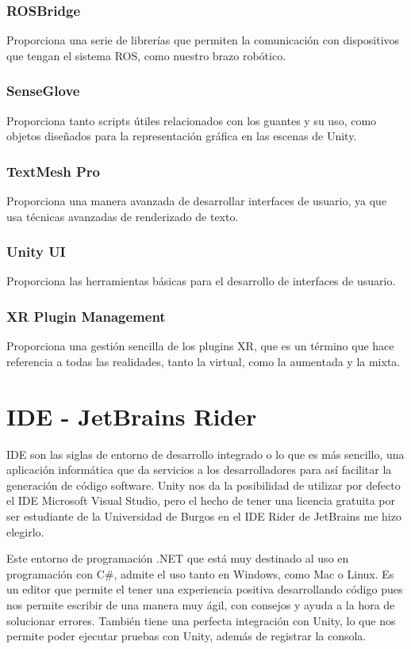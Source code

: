 \subsubsection{ROSBridge}
Proporciona una serie de librerías que permiten la comunicación con dispositivos que tengan el sistema ROS, como nuestro brazo robótico.
\subsubsection{SenseGlove}
Proporciona tanto scripts útiles relacionados con los guantes y su uso, como objetos diseñados para la representación gráfica en las escenas de Unity. 
\subsubsection{TextMesh Pro}
Proporciona una manera avanzada de desarrollar interfaces de usuario, ya que usa técnicas avanzadas de renderizado de texto.
\subsubsection{Unity UI}
Proporciona las herramientas básicas para el desarrollo de interfaces de usuario.
\subsubsection{XR Plugin Management}
Proporciona una gestión sencilla de los plugins XR, que es un término que hace referencia a todas las realidades, tanto la virtual, como la aumentada y la mixta.

\newpage

\section{IDE - JetBrains Rider}
IDE son las siglas de entorno de desarrollo integrado o lo que es más sencillo, una aplicación informática que da servicios a los desarrolladores para así facilitar la generación de código software.
Unity nos da la posibilidad de utilizar por defecto el IDE Microsoft Visual Studio, pero el hecho de tener una licencia gratuita por ser estudiante de la Universidad de Burgos en el IDE Rider\cite{Rider} de JetBrains me hizo elegirlo.

Este entorno de programación .NET que está muy destinado al uso en programación con C\#, admite el uso tanto en Windows, como Mac o Linux. Es un editor que permite el tener una experiencia positiva desarrollando código pues nos permite escribir de una manera muy ágil, con consejos y ayuda a la hora de solucionar errores. También tiene una perfecta integración con Unity, lo que nos permite poder ejecutar pruebas con Unity, además de registrar la consola.

